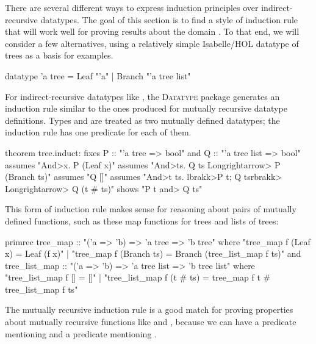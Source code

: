There are several different ways to express induction principles over indirect-recursive datatypes. The goal of this section is to find a style of induction rule that will work well for proving results about the domain . To that end, we will consider a few alternatives, using a relatively simple Isabelle/HOL datatype of trees as a basis for examples.
%
\begin{isacode}
datatype 'a tree = Leaf "'a" | Branch "'a tree list"
\end{isacode}
%
For indirect-recursive datatypes like , the \textsc{Datatype} package generates an induction rule similar to the ones produced for mutually recursive datatype definitions. Types  and  are treated as two mutually defined datatypes; the induction rule has one predicate for each of them.
%
\begin{isacode}
theorem tree.induct:
  fixes P :: "'a tree => bool" and Q :: "'a tree list => bool"
  assumes "\<And>x. P (Leaf x)"
  assumes "\<And>ts. Q ts \<Longrightarrow> P (Branch ts)"
  assumes "Q []"
  assumes "\<And>t ts. \<lbrakk>P t; Q ts\<rbrakk> \<Longrightarrow> Q (t # ts)"
  shows "P t \<and> Q ts"
\end{isacode}
%
This form of induction rule makes sense for reasoning about pairs of mutually defined functions, such as these map functions for trees and lists of trees:
%
\begin{isacode}
primrec tree_map :: "('a => 'b) => 'a tree => 'b tree"
  where "tree_map f (Leaf x) = Leaf (f x)"
  | "tree_map f (Branch ts) = Branch (tree_list_map f ts)"
and tree_list_map :: "('a => 'b) => 'a tree list => 'b tree list"
  where "tree_list_map f [] = []"
  | "tree_list_map f (t # ts) = tree_map f t # tree_list_map f ts"
\end{isacode}
%
The mutually recursive induction rule  is a good match for proving properties about mutually recursive functions like  and , because we can have a predicate  mentioning  and a predicate  mentioning .

